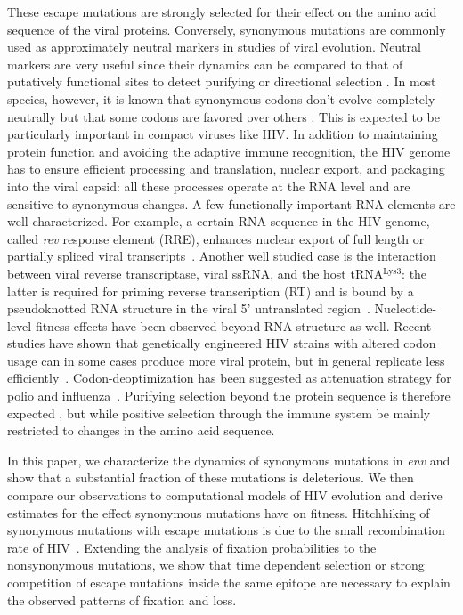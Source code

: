 \documentclass[rmp, twocolumn]{revtex4}
\newcommand{\rev}{\textit{rev}}
\newcommand{\env}{\textit{env}}
\begin{document}
These escape mutations are strongly selected for their effect on the amino acid
sequence of the viral proteins. Conversely, synonymous mutations are commonly
used as approximately neutral markers in studies of viral evolution. Neutral
markers are very useful since their dynamics can be compared to
that of putatively functional sites to detect purifying or directional selection
\citep{Bhatt:2011p43255,Hurst:2002p32608,Chen:2004p22606}. In most species,
however, it is  known that synonymous codons don't evolve completely neutrally
but that some codons are favored over others \citep{plotkin_synonymous_2011}.
This is expected to be particularly important in compact viruses like HIV. 
In addition to maintaining protein function and avoiding the adaptive immune
recognition, the HIV genome has to ensure efficient processing and translation,
nuclear export, and packaging into the viral capsid: all these processes operate at the RNA
level and are sensitive to synonymous changes. A few functionally important RNA
elements are well characterized. For example, a certain RNA sequence in the HIV
genome, called \rev{} response element (RRE), enhances nuclear export of
full length or partially spliced viral transcripts~\citep{fernandes_hiv-1_2012}.
Another well studied case is the interaction between viral reverse transcriptase, viral ssRNA, and the host
tRNA$^\text{Lys3}$: the latter is required for priming reverse transcription
(RT) and is bound by a pseudoknotted RNA structure in the viral 5'
untranslated region~\citep{barat_interaction_1991, paillart_vitro_2002}.
Nucleotide-level fitness effects have been observed beyond RNA structure as
well. Recent studies have shown that genetically engineered HIV strains with
altered codon usage can in some cases produce more viral protein, but in general
replicate less efficiently~\citep{ngumbela_quantitative_2008,
li_codon-usage-based_2012,keating_rich_2009}.
Codon-deoptimization has been suggested as attenuation strategy for polio and 
influenza~\citep{mueller_live_2010,coleman_virus_2008}. Purifying
selection beyond the protein sequence is therefore expected
\citep{forsdyke_reciprocal_1995,snoeck_mapping_2011}, but while positive
selection through the immune system be mainly restricted to changes in the
amino acid sequence.


In this paper, we characterize the dynamics of synonymous mutations in \env{}
and show that a substantial fraction of these mutations is deleterious. We then
compare our observations to computational models of HIV evolution and derive
estimates for the effect synonymous mutations have on fitness.
Hitchhiking of synonymous mutations with escape mutations is due to the small
recombination rate of HIV~\citep{neher_recombination_2010,
batorsky_estimate_2011}. Extending the analysis of fixation probabilities to the
nonsynonymous mutations, we show that time dependent selection or strong
competition of escape mutations inside the same epitope are necessary to explain
the observed patterns of fixation and loss.
\end{document}
